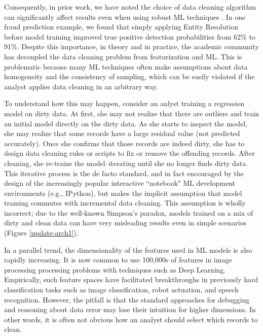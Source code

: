 Consequently, in prior work, we have noted the choice of data cleaning algorithm can significantly affect results even when using robust ML techniques \cite{activecleanarxiv, DBLP:conf/case/MahlerKLSMKPWFAG14}.
In one fraud prediction example, we found that simply applying Entity Resolution before model training improved true positive detection probabilities from 62\% to 91\%. 
Despite this importance, in theory and in practice, the academic community has decoupled the data cleaning problem from featurization and ML.
This is problematic because many ML techniques often make assumptions about data homogeneity and the consistency of sampling, which can be easily violated if the analyst applies data cleaning in an arbitrary way.

To understand how this may happen, consider an anlyst training a regression model on dirty data. At first, she may not realize that there are outliers and train an initial model directly on the dirty data. As she starts to inspect the model, she may realize that some records have a large residual value (not predicted accurately). Once she confirms that those records are indeed dirty, she has to design data cleaning rules or scripts to fix or remove the offending records. After cleaning, she re-trains the model--iterating until she no longer finds dirty data.
This iterative process is the de facto standard, and in fact encouraged by the design of the increasingly popular interactive ``notebook" ML development environments (e.g., IPython), but makes the implicit assumption that model training commutes with incremental data cleaning.
This assumption is wholly incorrect; due to the well-known Simpson's paradox, models trained on a mix of dirty and clean data can have very misleading results even in simple scenarios (Figure \ref{update-arch1}).

In a parallel trend, the dimensionality of the features used in ML models is also rapidly increasing. 
It is now common to use 100,000s of features in image processing processing problems with techniques such as Deep Learning.
Empirically, such feature spaces have facilitated breakthroughs in previously hard classification tasks such as image classification, robot actuation, and speech recognition.
However, the pitfall is that the standard approaches for debugging and reasoning about data error may lose their intuition for higher dimensions.
In other words, it is often not obvious how an analyst should select which records to clean.

